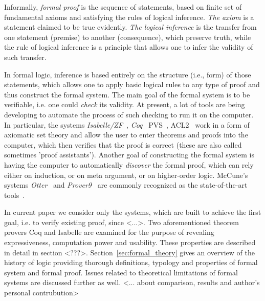 \documentclass[article]{aaltoseries}
\begin{document}

Informally, \textit{formal proof} is the sequence of statements, based on finite set of fundamental axioms and satisfying the rules of logical inference. \textit{The axiom} is a statement claimed to be true evidently. \textit{The logical inference} is the transfer from one statement (premise) to another (consequence), which preserve truth, while the rule of logical inference is a principle that allows one to infer the validity of such transfer. 

In formal logic, inference is based entirely on the structure (i.e., form) of those statements, which allows one to apply basic logical rules to any type of proof and thus construct the formal system.
The main goal of the formal system is to be verifiable, i.e. one could \textit{check} its validity. At present, a lot of tools are being developing to automate the process of such checking to run it on the computer. In particular, the systems \textit{Isabelle/ZF}~\cite{Isabelle}, \textit{Coq}~\cite{Coq} PVS~\cite{Pvs}, ACL2~\cite{Acl} work in a form of axiomatic set theory and allow the user to enter theorems and proofs into the computer, which then verifies that the proof is correct (these are also called sometimes 'proof assistants').
Another goal of constructing the formal system is having the computer to automatically \textit{discover} the formal proof, which can rely either on induction, or on meta argument, or on higher-order logic. McCune’s systems \textit{Otter}~\cite{Otter} and \textit{Prover9}~\cite{Prover9} are commonly recognized as the state-of-the-art tools~\cite{Com00}.

In current paper we consider only the systems, which are built to achieve the first goal, i.e. to verify existing proof, since <...>. Two aforementioned theorem provers Coq and Isabelle are examined for the purpose of revealing expressiveness, computation power and usability. These properties are described in detail in section <???>. Section~\ref{sec:formal_theory} gives an overview of the history of logic providing thorough definitions, typology and properties of formal system and formal proof. Issues related to theoretical limitations of formal systems are discussed further as well. <... about comparison, results and author's personal contrubution>
\end{document}
